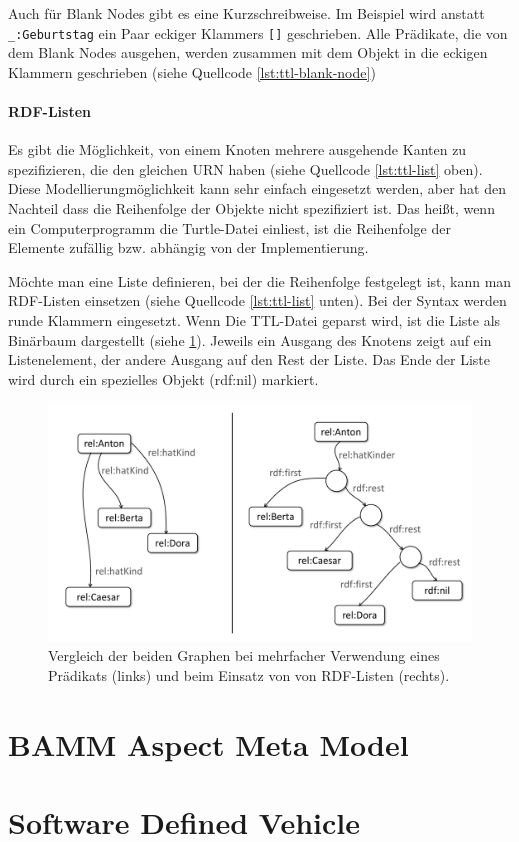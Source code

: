 Auch für Blank Nodes gibt es eine Kurzschreibweise. Im Beispiel wird anstatt \lstinline|_:Geburtstag| ein Paar eckiger Klammers \lstinline|[]| geschrieben. Alle Prädikate, die von dem Blank Nodes ausgehen, werden zusammen mit dem Objekt in die eckigen Klammern geschrieben (siehe Quellcode \ref{lst:ttl-blank-node})

\paragraph{RDF-Listen}
Es gibt die Möglichkeit, von einem Knoten mehrere ausgehende Kanten zu spezifizieren, die den gleichen URN haben (siehe Quellcode \ref{lst:ttl-list} oben). Diese Modellierungmöglichkeit kann sehr einfach eingesetzt werden, aber hat den Nachteil dass die Reihenfolge der Objekte nicht spezifiziert ist. Das heißt, wenn ein Computerprogramm  die Turtle-Datei einliest, ist die Reihenfolge der Elemente zufällig bzw. abhängig von der Implementierung.

Möchte man eine Liste definieren, bei der die Reihenfolge festgelegt ist, kann man RDF-Listen einsetzen (siehe Quellcode \ref{lst:ttl-list} unten). Bei der Syntax werden runde Klammern eingesetzt. Wenn Die TTL-Datei geparst wird, ist die Liste als Binärbaum dargestellt (siehe \ref{fig:rdflist}). Jeweils ein Ausgang des Knotens zeigt auf ein Listenelement, der andere Ausgang auf den Rest der Liste. Das Ende der Liste wird durch ein spezielles Objekt (rdf:nil) markiert.

\begin{figure}
	\centering
	\includegraphics[width=0.7\linewidth]{resources/figures/rdfList}
	\caption[Vergleich von Merhfachverwendung eines Prädikats und RDF-Listen]{Vergleich der beiden Graphen bei mehrfacher Verwendung eines Prädikats (links) und beim Einsatz von von RDF-Listen (rechts).}
	\label{fig:rdflist}
\end{figure}



\section{BAMM Aspect Meta Model}
\section{Software Defined Vehicle}

